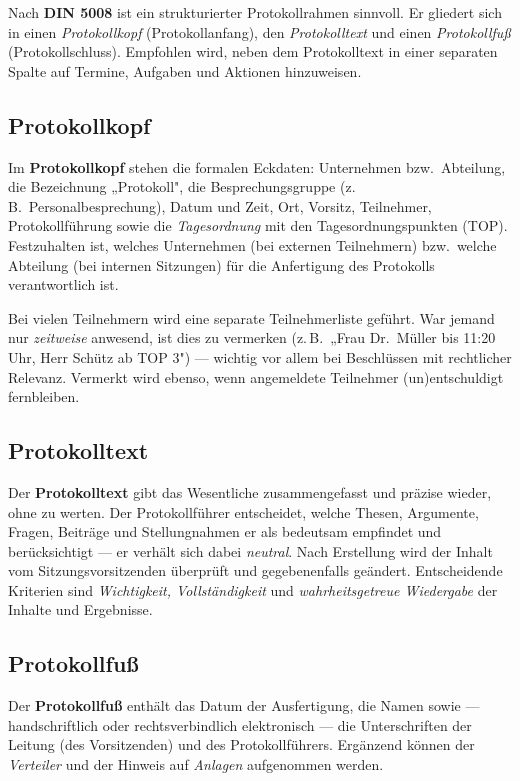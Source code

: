 \documentclass[11pt, a4paper]{article}
\begin{document}
Nach \textbf{DIN 5008} ist ein strukturierter Protokollrahmen sinnvoll. Er gliedert sich
in einen \emph{Protokollkopf} (Protokollanfang), den \emph{Protokolltext} und einen
\emph{Protokollfuß} (Protokollschluss). Empfohlen wird, neben dem Protokolltext in einer
separaten Spalte auf Termine, Aufgaben und Aktionen hinzuweisen.

\subsection{Protokollkopf}

Im \textbf{Protokollkopf} stehen die formalen Eckdaten: Unternehmen bzw.\ Abteilung, die
Bezeichnung „Protokoll", die Besprechungsgruppe (z.\,B.\ Personalbesprechung), Datum und
Zeit, Ort, Vorsitz, Teilnehmer, Protokollführung sowie die \emph{Tagesordnung} mit den
Tagesordnungspunkten (TOP). Festzuhalten ist, welches Unternehmen (bei externen
Teilnehmern) bzw.\ welche Abteilung (bei internen Sitzungen) für die Anfertigung des
Protokolls verantwortlich ist.

\begin{merksatz}
Bei vielen Teilnehmern wird eine separate Teilnehmerliste geführt. War jemand nur
\emph{zeitweise} anwesend, ist dies zu vermerken (z.\,B.\ „Frau Dr.\ Müller bis 11:20 Uhr,
Herr Schütz ab TOP 3") --- wichtig vor allem bei Beschlüssen mit rechtlicher Relevanz.
Vermerkt wird ebenso, wenn angemeldete Teilnehmer (un)entschuldigt fernbleiben.
\end{merksatz}

\subsection{Protokolltext}

Der \textbf{Protokolltext} gibt das Wesentliche zusammengefasst und präzise wieder, ohne
zu werten. Der Protokollführer entscheidet, welche Thesen, Argumente, Fragen, Beiträge
und Stellungnahmen er als bedeutsam empfindet und berücksichtigt --- er verhält sich dabei
\emph{neutral}. Nach Erstellung wird der Inhalt vom Sitzungsvorsitzenden überprüft und
gegebenenfalls geändert. Entscheidende Kriterien sind \emph{Wichtigkeit, Vollständigkeit}
und \emph{wahrheitsgetreue Wiedergabe} der Inhalte und Ergebnisse.

\subsection{Protokollfuß}

Der \textbf{Protokollfuß} enthält das Datum der Ausfertigung, die Namen sowie ---
handschriftlich oder rechtsverbindlich elektronisch --- die Unterschriften der Leitung
(des Vorsitzenden) und des Protokollführers. Ergänzend können der \emph{Verteiler} und der
Hinweis auf \emph{Anlagen} aufgenommen werden.
\end{document}
